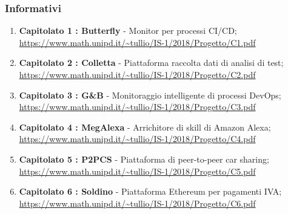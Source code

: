 			\subsubsection{Informativi}
				\begin{enumerate}
					\item \textbf{Capitolato 1 : Butterfly} - Monitor per processi CI/CD;
						\newline
						\url{ https://www.math.unipd.it/~tullio/IS-1/2018/Progetto/C1.pdf}
					\item \textbf{Capitolato 2 : Colletta} - Piattaforma raccolta dati di analisi di test;
						\newline
						\url{https://www.math.unipd.it/~tullio/IS-1/2018/Progetto/C2.pdf}
					\item \textbf{Capitolato 3 : G\&B} - Monitoraggio intelligente di processi DevOps\pedice;
						\newline
						\url{https://www.math.unipd.it/~tullio/IS-1/2018/Progetto/C3.pdf}
					\item \textbf{Capitolato 4 : MegAlexa} - Arrichitore di skill di Amazon Alexa;
						\newline
						\url{https://www.math.unipd.it/~tullio/IS-1/2018/Progetto/C4.pdf}
					\item \textbf{Capitolato 5 : P2PCS} - Piattaforma di peer-to-peer car sharing; 
						\newline 
						\url{https://www.math.unipd.it/~tullio/IS-1/2018/Progetto/C5.pdf}
					\item \textbf{Capitolato 6 : Soldino} - Piattaforma Ethereum per pagamenti IVA;
						\newline 
						\url{https://www.math.unipd.it/~tullio/IS-1/2018/Progetto/C6.pdf}
            \end{enumerate}
